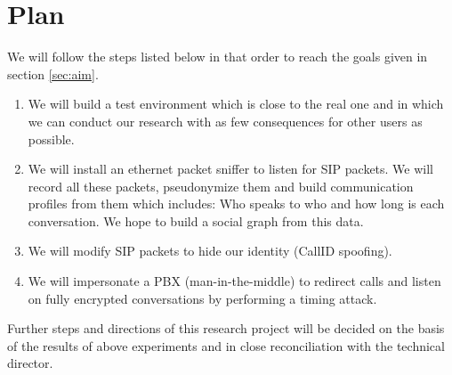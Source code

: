 \section{Plan}

We will follow the steps listed below in that order to reach the goals given in section \ref{sec:aim}. 

\begin{enumerate}
\item We will build a test environment which is close to the real one and in which we can conduct our research with as few consequences for other users as possible.
\item We will install an ethernet packet sniffer to listen for SIP packets. We will record all these packets, pseudonymize them and build communication profiles from them which includes: Who speaks to who and how long is each conversation. We hope to build a social graph from this data.
\item We will modify SIP packets to hide our identity (CallID spoofing).
\item We will impersonate a PBX (man-in-the-middle) to redirect calls and listen on fully encrypted conversations by performing a timing attack.
\end{enumerate}

Further steps and directions of this research project will be decided on the basis of the results of above experiments and in close reconciliation with the technical director. 
